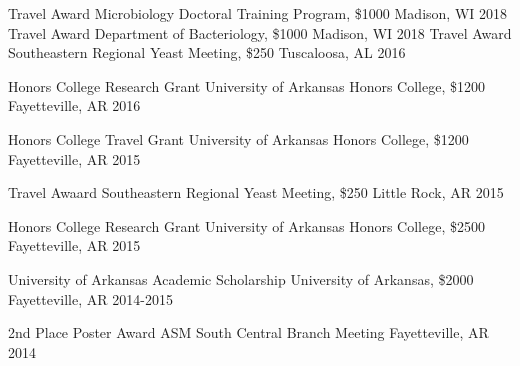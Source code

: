 \begin{cvhonors}
  \cvhonor
    {Travel Award} %
    {Microbiology Doctoral Training Program, \$1000} %
    {Madison, WI} %
    {2018} %
  \cvhonor
    {Travel Award} %
    {Department of Bacteriology, \$1000} %
    {Madison, WI} %
    {2018} %
  \cvhonor
    {Travel Award} %
    {Southeastern Regional Yeast Meeting, \$250} %
    {Tuscaloosa, AL} %
    {2016} %

  \cvhonor
    {Honors College Research Grant} %
    {University of Arkansas Honors College, \$1200} %
    {Fayetteville, AR} %
    {2016} %

  \cvhonor
    {Honors College Travel Grant} %
    {University of Arkansas Honors College, \$1200} %
    {Fayetteville, AR} %
    {2015} %

  \cvhonor
    {Travel Awaard} %
    {Southeastern Regional Yeast Meeting, \$250} %
    {Little Rock, AR} %
    {2015} %

  \cvhonor
    {Honors College Research Grant} %
    {University of Arkansas Honors College, \$2500} %
    {Fayetteville, AR} %
    {2015} %

   \cvhonor
    {University of Arkansas Academic Scholarship} %
    {University of Arkansas, \$2000} %
    {Fayetteville, AR} %
    {2014-2015} %

  \cvhonor
    {2nd Place Poster Award} %
    {ASM South Central Branch Meeting} %
    {Fayetteville, AR} %
    {2014} %


\end{cvhonors}

